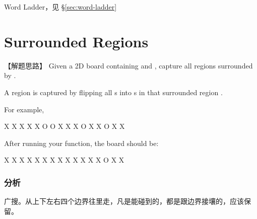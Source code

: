 \begindot
\item Word Ladder，见 \S \ref{sec:word-ladder}
\myenddot


\section{Surrounded Regions} %
\label{sec:surrounded-regions}


【解题思路】
Given a 2D board containing  and , capture all regions surrounded by .

A region is captured by flipping all s into s in that surrounded region .

For example,
\begin{Code}
	X X X X
	X O O X
	X X O X
	X O X X
\end{Code}

After running your function, the board should be:
\begin{Code}
	X X X X
	X X X X
	X X X X
	X O X X
\end{Code}


\subsubsection{分析}
广搜。从上下左右四个边界往里走，凡是能碰到的，都是跟边界接壤的，应该保留。


